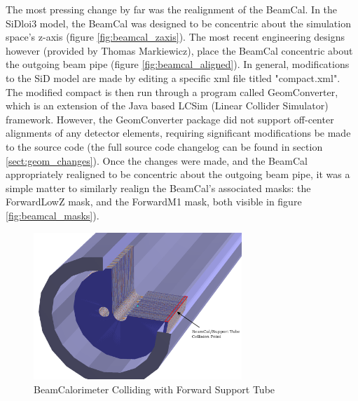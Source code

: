 \documentclass{report}
\begin{document}
            The most pressing change by far was the realignment of the BeamCal. In the SiDloi3 model, the BeamCal was designed to be concentric about the simulation space's z-axis (figure \ref{fig:beamcal_zaxis}). The most recent engineering designs however (provided by Thomas Markiewicz), place the BeamCal concentric about the outgoing beam pipe (figure \ref{fig:beamcal_aligned}). In general, modifications to the SiD model are made by editing a specific xml file titled "compact.xml". The modified compact is then run through a program called GeomConverter, which is an extension of the Java based LCSim (Linear Collider Simulator) framework. However, the GeomConverter package did not support off-center alignments of any detector elements, requiring significant modifications be made to the source code (the full source code changelog can be found in section \ref{sect:geom_changes}). Once the changes were made, and the BeamCal appropriately realigned to be concentric about the outgoing beam pipe, it was a simple matter to similarly realign the BeamCal's associated masks: the ForwardLowZ mask, and the ForwardM1 mask, both visible in figure \ref{fig:beamcal_masks}). 

            \begin{figure}[h] 
                \includegraphics[width=0.7\textwidth]{beamcal_collide}
                \centering
                \caption{BeamCalorimeter Colliding with Forward Support Tube}
                \label{fig:beamcal_collide}
            \end{figure}
\end{document}
